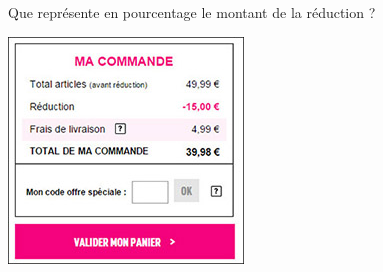 
Que représente en pourcentage le montant de la réduction ?

\begin{center}
\includegraphics[scale=0.7]{Prop-45.jpg}
\end{center}
